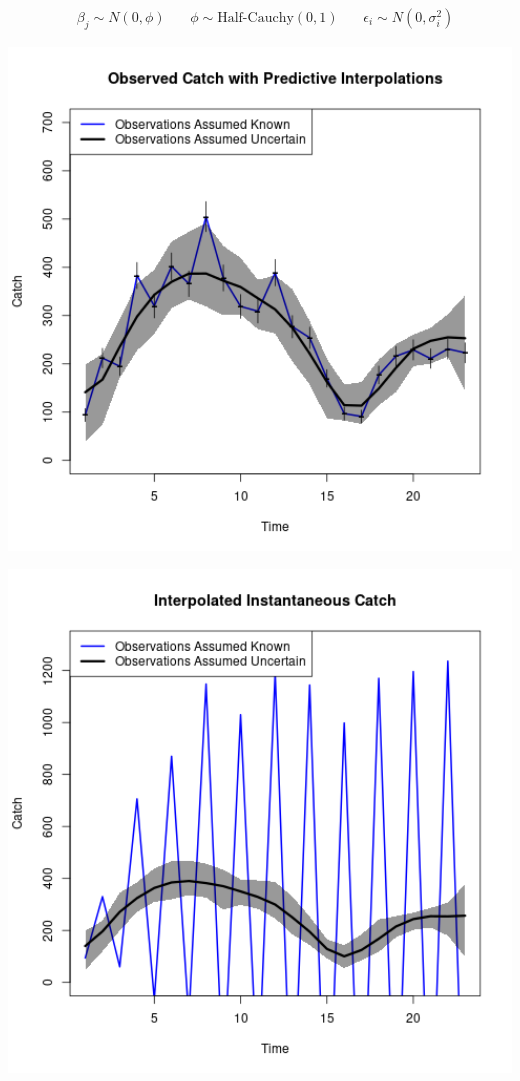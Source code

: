 \documentclass[ xcolor = pdftex, dvipsnames, table ]{beamer}
\begin{document}
\begin{frame}
{\begin{align*}
&\beta_j \sim N(0, \phi) ~~~~ ~~~~ \phi \sim \text{Half-Cauchy}(0, 1) ~~~~ ~~~~ \epsilon_i \sim N(0, \sigma^2_i) \nonumber
\end{align*}
%
\begin{minipage}[h!]{0.49\textwidth}
\includegraphics[width=1\textwidth]{../../.././nick/spline/dataPlots.png}%
\end{minipage}
\begin{minipage}[h!]{0.49\textwidth}
\includegraphics[width=1\textwidth]{../../.././nick/spline/intCurves.png}%

\end{minipage}}
\end{frame}
\end{document}
